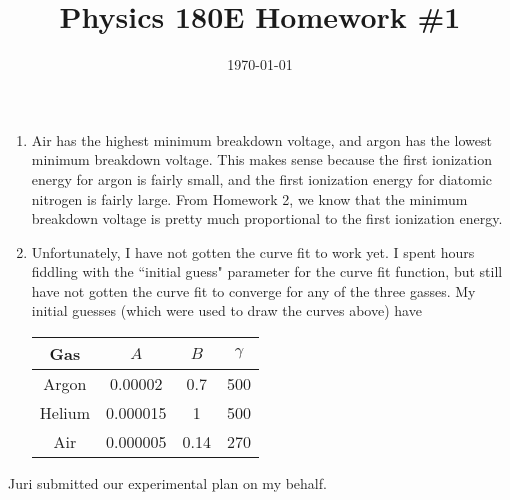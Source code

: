 \documentclass{article}
\date{\today}
\title{Physics 180E Homework \#1}
\begin{document}
\maketitle

\begin{prob}
\end{prob}
\begin{enumerate}[label=(\alph*)]
    \item Air has the highest minimum breakdown voltage, and argon has the lowest minimum breakdown voltage. This makes sense because the first ionization energy for argon is fairly small, and the first ionization energy for diatomic nitrogen is fairly large. From Homework 2, we know that the minimum breakdown voltage is pretty much proportional to the first ionization energy.
    \item Unfortunately, I have not gotten the curve fit to work yet. I spent hours fiddling with the ``initial guess" parameter for the curve fit function, but still have not gotten the curve fit to converge for any of the three gasses. My initial guesses (which were used to draw the curves above) have

\begin{center}
\begin{tabular}{ |c||c|c|c| } 
    \hline
    Gas & $A$ & $B$ & $\gamma$ \\
    \hline
    \hline
    Argon & 0.00002 & 0.7 & 500 \\ 
    Helium & 0.000015 & 1 & 500 \\ 
    Air & 0.000005 & 0.14 & 270 \\ 
    \hline
\end{tabular}
\end{center}

\end{enumerate}


\bigskip
\par
\begin{prob}
\end{prob}
Juri submitted our experimental plan on my behalf.


\end{document}
